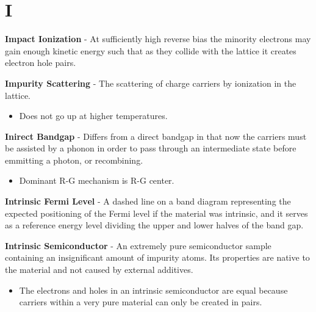 \section{I}
    \textbf{Impact Ionization} - At sufficiently high reverse bias the minority electrons may gain enough kinetic energy such that as they collide with the lattice it creates electron hole pairs.

\vspace{0.5cm}
\noindent
    \textbf{Impurity Scattering} - The scattering of charge carriers by ionization in the lattice.
    \vspace{0.15cm}
    \begin{itemize}
        \setlength\itemsep{0.5em}
        \item{Does not go up at higher temperatures.}
    \end{itemize}
\vspace{0.5cm}
    \textbf{Inirect Bandgap} - Differs from a direct bandgap in that now the carriers must be assisted by a phonon in order to pass through an intermediate state before emmitting a photon, or recombining.
    \begin{itemize}
        \setlength\itemsep{0.5em}
        \item{Dominant R-G mechanism is R-G center.}
    \end{itemize}
\vspace{0.5cm}
    \textbf{Intrinsic Fermi Level} - A dashed line on a band diagram representing the expected positioning of the Fermi level if the material was intrinsic, and it serves as a reference energy level dividing the upper and lower halves of the band gap.

\vspace{0.5cm}
\noindent
    \textbf{Intrinsic Semiconductor} - An extremely pure semiconductor sample containing an insignificant amount of impurity atoms.  Its properties are native to the material and not caused by external additives.
    \vspace{0.15cm}
    \begin{itemize}
        \setlength\itemsep{0.5em}
        \item{The electrons and holes in an intrinsic semiconductor are equal because carriers within a very pure material can only be created in pairs.}
    \end{itemize}
